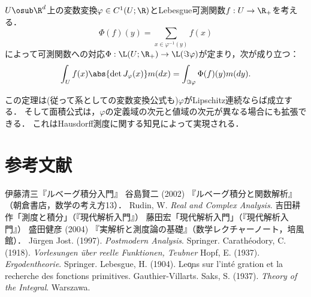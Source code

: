 \documentclass[uplatex, dvipdfmx]{jsreport}
\begin{document}
\begin{theorem}
    $U\osub\R^d$上の変数変換$\varphi\in C^1(U;\R)$とLebesgue可測関数$f:U\to\R_+$を考える．
    \[\Phi(f)(y)=\sum_{x\in\varphi^{-1}(y)}f(x)\]
    によって可測関数への対応$\Phi:\L(U;\R_+)\to\L(\Im\varphi)$が定まり，次が成り立つ：
    \[\int_Uf(x)\abs{\det J_\varphi(x)}m(dx)=\int_{\Im\varphi}\Phi(f)(y)m(dy).\]
\end{theorem}

\begin{remarks}
    この定理は(従って系としての変数変換公式も)$\varphi$がLipschitz連続ならば成立する．
    そして面積公式は，$\varphi$の定義域の次元と値域の次元が異なる場合にも拡張できる．
    これはHausdorff測度に関する知見によって実現される．
\end{remarks}

\chapter{参考文献}


\begin{thebibliography}{99}
    伊藤清三『ルベーグ積分入門』
    谷島賢二 (2002) 『ルベーグ積分と関数解析』（朝倉書店，数学の考え方13）．
    Rudin, W. \textit{Real and Complex Analysis}.
    吉田耕作「測度と積分」（『現代解析入門』）
    藤田宏「現代解析入門」（『現代解析入門』）
    盛田健彦 (2004) 『実解析と測度論の基礎』（数学レクチャーノート，培風館）．
    Jürgen Jost. (1997). \textit{Postmodern Analysis}. Springer.
    Carathéodory, C. (1918). \textit{Vorlesungen über reelle Funktionen, Teubner}
    Hopf, E. (1937). \textit{Ergodentheorie}. Springer.
    Lebesgue, H. (1904). Le\c ons sur l'int\'{e} gration et la recherche des fonctions primitives. Gauthier-Villarts.
    Saks, S. (1937). \textit{Theory of the Integral}. Warszawa.
\end{thebibliography}
\end{document}
